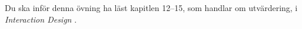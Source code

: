 Du ska inför denna övning ha läst kapitlen 12--15, som handlar om utvärdering, 
i \emph{Interaction Design} \citep{Sharp2011idb}.
